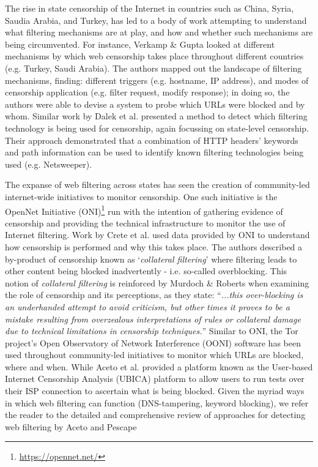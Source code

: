 \documentclass{bmcart}
\begin{document}
The rise in state censorship of the Internet in countries such as China, Syria, Saudia Arabia, and Turkey, has led to a body of work attempting to understand what filtering mechanisms are at play, and how and whether such mechanisms are being circumvented.
For instance, Verkamp \& Gupta \cite{verkamp2012inferring} looked at different mechanisms by which web censorship takes place throughout different countries (e.g. Turkey, Saudi Arabia).
The authors mapped out the landscape of filtering mechanisms, finding: different triggers (e.g. hostname, IP address), and modes of censorship application (e.g. filter request, modify response); in doing so, the authors were able to devise a system to probe which URLs were blocked and by whom.
Similar work by Dalek et al. \cite{dalek2013method} presented a method to detect which filtering technology is being used for censorship, again focussing on state-level censorship.
Their approach demonstrated that a combination of HTTP headers' keywords and path information can be used to identify known filtering technologies being used (e.g. Netsweeper).

The expanse of web filtering across states has seen the creation of community-led internet-wide initiatives to monitor censorship.
One such initiative is the OpenNet Initiative (ONI)\footnote{\url{https://opennet.net/}} run with the intention of gathering evidence of censorship and providing the technical infrastructure to monitor the use of Internet filtering.
Work by Crete et al. \cite{crete2013not} used data provided by ONI to understand how censorship is performed and why this takes place.
The authors described a by-product of censorship known as `\textit{collateral filtering}' where filtering leads to other content being blocked inadvertently - i.e. so-called overblocking.
This notion of \textit{collateral filtering} is reinforced by Murdoch \& Roberts \cite{murdoch2013internet} when examining the role of censorship and its perceptions, as they state: ``\textit{...this over-blocking is an underhanded attempt to avoid criticism, but other times it proves to be a mistake resulting from overzealous interpretations of rules or collateral damage due to technical limitations in censorship techniques.}''
Similar to ONI, the Tor project's Open Observatory of Network Interference (OONI) software \cite{ooni2015} has been used throughout community-led initiatives to monitor which URLs are blocked, where and when.
While Aceto et al. \cite{aceto2015monitoring} provided a platform known as the User-based Internet Censorship Analysis (UBICA) platform to allow users to run tests over their ISP connection to ascertain what is being blocked.
Given the myriad ways in which web filtering can function (DNS-tampering, keyword blocking), we refer the reader to the detailed and comprehensive review of approaches for detecting web filtering by Aceto and Pescape \cite{aceto2015internet}
\end{document}

